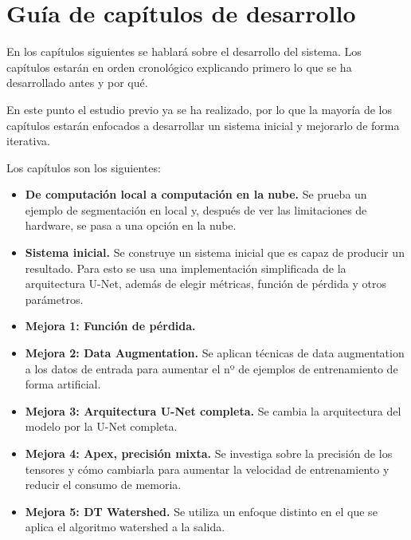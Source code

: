 \chapter{Gu\'ia de cap\'itulos de desarrollo}\label{guiacapitulos}

En los capítulos siguientes se hablará sobre el desarrollo del sistema. Los capítulos estarán en orden cronológico explicando primero lo que se ha desarrollado antes y por qué.

En este punto el estudio previo ya se ha realizado, por lo que la mayoría de los capítulos estarán enfocados a desarrollar un sistema inicial y mejorarlo de forma iterativa. 

Los capítulos son los siguientes:

\begin{itemize}
\item \textbf{De computación local a computación en la nube.} Se prueba un ejemplo de segmentación en local y, después de ver las limitaciones de hardware, se pasa a una opción en la nube.
\item \textbf{Sistema inicial.} Se construye un sistema inicial que es capaz de producir un resultado. Para esto se usa una implementación simplificada de la arquitectura U-Net, además de elegir métricas, función de pérdida y otros parámetros.
\item \textbf{Mejora 1: Función de pérdida.} 
\item \textbf{Mejora 2: Data Augmentation.} Se aplican técnicas de data augmentation a los datos de entrada para aumentar el nº de ejemplos de entrenamiento de forma artificial.
\item \textbf{Mejora 3: Arquitectura U-Net completa.} Se cambia la arquitectura del modelo por la U-Net completa.
\item \textbf{Mejora 4: Apex, precisión mixta.} Se investiga sobre la precisión de los tensores y cómo cambiarla para aumentar la velocidad de entrenamiento y reducir el consumo de memoria.
\item \textbf{Mejora 5: DT Watershed.} Se utiliza un enfoque distinto en el que se aplica el algoritmo watershed a la salida.
\end{itemize}